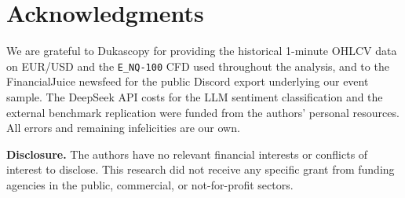 \section*{Acknowledgments}

We are grateful to Dukascopy for providing the historical 1-minute
OHLCV data on EUR/USD and the \texttt{E\_NQ-100} CFD used throughout
the analysis, and to the FinancialJuice newsfeed for the public
Discord export underlying our event sample. The DeepSeek API costs
for the LLM sentiment classification and the external benchmark
replication were funded from the authors' personal resources. All
errors and remaining infelicities are our own.

\medskip
\noindent\textbf{Disclosure.} The authors have no relevant financial
interests or conflicts of interest to disclose. This research did not
receive any specific grant from funding agencies in the public,
commercial, or not-for-profit sectors.
